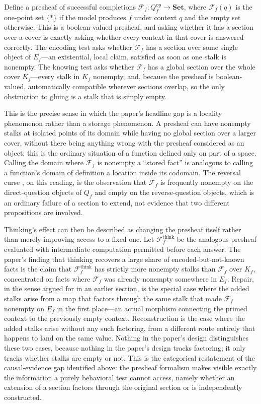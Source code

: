 \documentclass[11pt]{article}
\begin{document}
Define a presheaf of successful completions $\mathcal{F}_f : Q_f^{\mathrm{op}} \to \mathbf{Set}$, where $\mathcal{F}_f(q)$ is the one-point set $\{\ast\}$ if the model produces $f$ under context $q$ and the empty set otherwise. This is a boolean-valued presheaf, and asking whether it has a section over a cover is exactly asking whether every context in that cover is answered correctly. The encoding test asks whether $\mathcal{F}_f$ has a section over some single object of $E_f$---an existential, local claim, satisfied as soon as one stalk is nonempty. The knowing test asks whether $\mathcal{F}_f$ has a global section over the whole cover $K_f$---every stalk in $K_f$ nonempty, and, because the presheaf is boolean-valued, automatically compatible wherever sections overlap, so the only obstruction to gluing is a stalk that is simply empty.

This is the precise sense in which the paper's headline gap is a locality phenomenon rather than a storage phenomenon. A presheaf can have nonempty stalks at isolated points of its domain while having no global section over a larger cover, without there being anything wrong with the presheaf considered as an object; this is the ordinary situation of a function defined only on part of a space. Calling the domain where $\mathcal{F}_f$ is nonempty a ``stored fact'' is analogous to calling a function's domain of definition a location inside its codomain. The reversal curse \cite{berglund2024}, on this reading, is the observation that $\mathcal{F}_f$ is frequently nonempty on the direct-question objects of $Q_f$ and empty on the reverse-question objects, which is an ordinary failure of a section to extend, not evidence that two different propositions are involved.

Thinking's effect can then be described as changing the presheaf itself rather than merely improving access to a fixed one. Let $\mathcal{F}_f^{\mathrm{think}}$ be the analogous presheaf evaluated with intermediate computation permitted before each answer. The paper's finding that thinking recovers a large share of encoded-but-not-known facts is the claim that $\mathcal{F}_f^{\mathrm{think}}$ has strictly more nonempty stalks than $\mathcal{F}_f$ over $K_f$, concentrated on facts where $\mathcal{F}_f$ was already nonempty somewhere in $E_f$. Repair, in the sense argued for in an earlier section, is the special case where the added stalks arise from a map that factors through the same stalk that made $\mathcal{F}_f$ nonempty on $E_f$ in the first place---an actual morphism connecting the primed context to the previously empty context. Reconstruction is the case where the added stalks arise without any such factoring, from a different route entirely that happens to land on the same value. Nothing in the paper's design distinguishes these two cases, because nothing in the paper's design tracks factoring; it only tracks whether stalks are empty or not. This is the categorical restatement of the causal-evidence gap identified above: the presheaf formalism makes visible exactly the information a purely behavioral test cannot access, namely whether an extension of a section factors through the original section or is independently constructed.
\end{document}
